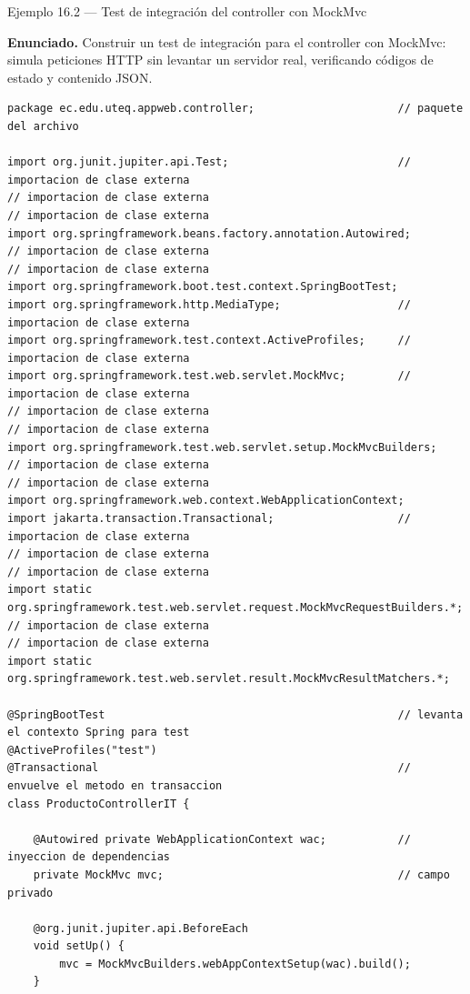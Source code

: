 \documentclass[11pt,a4paper,openany]{book}
\begin{document}
\begin{cajaejemplo}{Ejemplo 16.2 --- Test de integración del controller con MockMvc}

\textbf{Enunciado.} Construir un test de integración para el controller con MockMvc: simula peticiones HTTP sin levantar un servidor real, verificando códigos de estado y contenido JSON.

\begin{lstlisting}[style=java,caption={ProductoControllerIT.java},label=lst:16.2]
package ec.edu.uteq.appweb.controller;                      // paquete del archivo

import org.junit.jupiter.api.Test;                          // importacion de clase externa
// importacion de clase externa
// importacion de clase externa
import org.springframework.beans.factory.annotation.Autowired;
// importacion de clase externa
// importacion de clase externa
import org.springframework.boot.test.context.SpringBootTest;
import org.springframework.http.MediaType;                  // importacion de clase externa
import org.springframework.test.context.ActiveProfiles;     // importacion de clase externa
import org.springframework.test.web.servlet.MockMvc;        // importacion de clase externa
// importacion de clase externa
// importacion de clase externa
import org.springframework.test.web.servlet.setup.MockMvcBuilders;
// importacion de clase externa
// importacion de clase externa
import org.springframework.web.context.WebApplicationContext;
import jakarta.transaction.Transactional;                   // importacion de clase externa
// importacion de clase externa
// importacion de clase externa
import static org.springframework.test.web.servlet.request.MockMvcRequestBuilders.*;
// importacion de clase externa
// importacion de clase externa
import static org.springframework.test.web.servlet.result.MockMvcResultMatchers.*;

@SpringBootTest                                             // levanta el contexto Spring para test
@ActiveProfiles("test")
@Transactional                                              // envuelve el metodo en transaccion
class ProductoControllerIT {

    @Autowired private WebApplicationContext wac;           // inyeccion de dependencias
    private MockMvc mvc;                                    // campo privado

    @org.junit.jupiter.api.BeforeEach
    void setUp() {
        mvc = MockMvcBuilders.webAppContextSetup(wac).build();
    }


\end{lstlisting}
\end{cajaejemplo}
\end{document}
